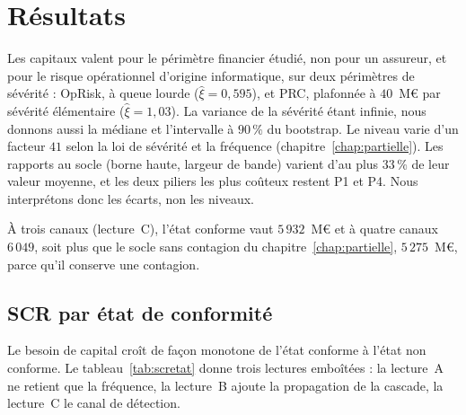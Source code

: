 
\chapter{Résultats}
\label{chap:resultats}
\label{part:resultats}

Les capitaux valent pour le périmètre financier étudié, non pour un assureur, et pour le
risque opérationnel d'origine informatique, sur deux périmètres de sévérité :
OpRisk, à queue lourde ($\hat\xi=0{,}595$), et PRC, plafonnée à $40$~M\euro{} par sévérité élémentaire ($\hat\xi=1{,}03$).
La variance de la sévérité étant infinie, nous donnons aussi la médiane et l'intervalle à $90\,\%$ du
bootstrap. Le niveau varie d'un facteur $41$ selon la loi de sévérité
et la fréquence (chapitre~\ref{chap:partielle}). Les rapports au socle (borne haute, largeur de bande)
varient d'au plus $33\,\%$ de leur valeur moyenne, et les deux piliers les plus coûteux restent P1 et
P4. Nous interprétons donc les écarts, non les niveaux.

À trois canaux (lecture~C), l'état conforme vaut $5\,932$~M\euro{} et à quatre canaux $6\,049$, soit
plus que le socle sans contagion du chapitre~\ref{chap:partielle}, $5\,275$~M\euro, parce qu'il
conserve une contagion.

\section{SCR par état de conformité}

Le besoin de capital croît de façon monotone de l'état conforme à l'état non conforme. Le
tableau~\ref{tab:scretat} donne trois lectures emboîtées : la lecture~A ne retient que la
fréquence, la lecture~B ajoute la propagation de la cascade, la lecture~C le canal de détection.

